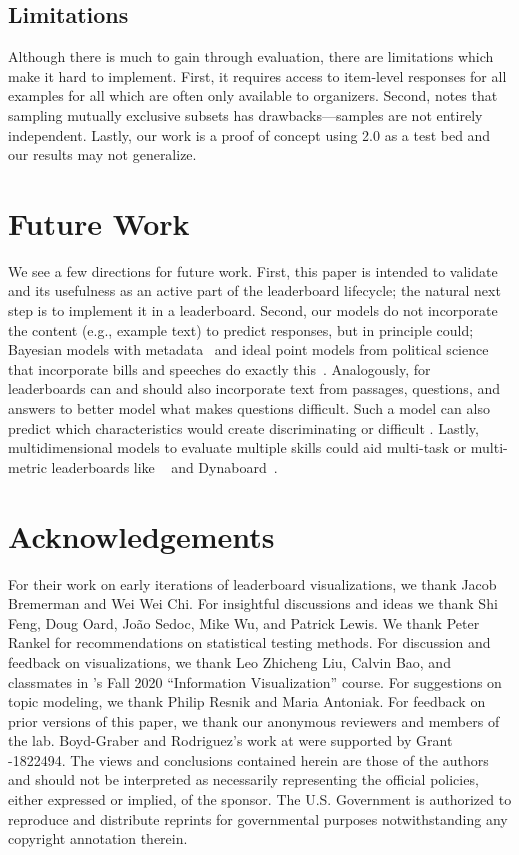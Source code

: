 \subsection{Limitations}
Although there is much to gain through \irt{} evaluation, there are limitations which make it hard to implement.
First, it requires access to item-level responses for all examples for all \subjs{} which are often only available to organizers.
Second, \citet{urbano2016reliability} notes that sampling mutually exclusive subsets has drawbacks---samples are not entirely independent.
Lastly, our work is a proof of concept using \squad{} 2.0 as a test bed and our results may not generalize.

\section{Future Work}
\label{ch:isicle:future}

We see a few directions for future work.
First, this paper is intended to validate \irt{} and its usefulness as an active part of the leaderboard lifecycle; the natural next step is to implement it in a leaderboard.
Second, our \irt{} models do not incorporate the \itm{} content (e.g., example text) to predict responses, but in principle could; Bayesian models with metadata~\citep{card2018meta} and ideal point models from political science~\citep{poole1985spatial} that incorporate bills and speeches do exactly this~\citep{gerrish2011text,nguyen2015tea,kraft2016vote}.
Analogously, \irt{} for leaderboards can and should also incorporate text from passages, questions, and answers to better model what makes questions difficult.
Such a model can also predict which characteristics would create discriminating or difficult \itms{}.
Lastly, multidimensional \irt{} models to evaluate multiple skills could aid multi-task or multi-metric leaderboards like ~\citep{fisch2019mrqa} and Dynaboard~\citep{ma2021dynaboard}.
\section*{Acknowledgements}

For their work on early iterations of leaderboard visualizations, we thank Jacob Bremerman and Wei Wei Chi.
For insightful discussions and ideas we thank Shi Feng, Doug Oard, João Sedoc, Mike Wu, and Patrick Lewis.
We thank Peter Rankel for recommendations on statistical testing methods.
For discussion and feedback on visualizations, we thank Leo Zhicheng Liu, Calvin Bao, and classmates in 's Fall 2020 ``Information Visualization'' course.
For suggestions on topic modeling, we thank Philip Resnik and Maria Antoniak.
For feedback on prior versions of this paper, we thank our anonymous  reviewers and members of the   lab.
Boyd-Graber and Rodriguez's work at  were supported by  Grant -1822494.
The views and conclusions contained herein are those of the authors and should not be interpreted as necessarily representing the official policies, either expressed or implied, of the sponsor.
The U.S. Government is authorized to reproduce and distribute reprints for governmental purposes notwithstanding any copyright annotation therein.
